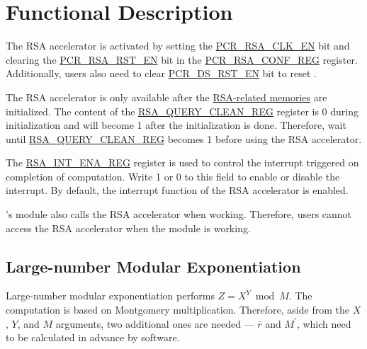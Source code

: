 \documentclass[main\_\_EN.tex]{subfiles}
\begin{document}
\section{Functional Description}

The RSA accelerator is activated by setting the \hyperref[fielddesc:PCRRSACLKEN]{PCR\_RSA\_CLK\_EN} bit and clearing the \hyperref[fielddesc:PCRRSARSTEN]{PCR\_RSA\_RST\_EN} bit in the \hyperref[regdesc:PCRRSACONFREG]{PCR\_RSA\_CONF\_REG} register. Additionally, users also need to clear \hyperref[fielddesc:PCRDSRSTEN]{PCR\_DS\_RST\_EN} bit to reset .

The RSA accelerator is only available after the \hyperref[sec:mem-sum]{RSA-related memories} are initialized. The content of the \hyperref[regdesc:RSAQUERYCLEANREG]{RSA\_QUERY\_CLEAN\_REG} register is 0 during initialization and will become 1 after the initialization is done. Therefore, wait until \hyperref[regdesc:RSAQUERYCLEANREG]{RSA\_QUERY\_CLEAN\_REG} becomes 1 before using the RSA accelerator.
 
The \hyperref[regdesc:RSAINTENAREG]{RSA\_INT\_ENA\_REG} register is used to control the interrupt triggered on completion of computation. Write 1 or 0 to this field to enable or disable the interrupt. By default, the interrupt function of the RSA accelerator is enabled.


\begin{importantlisting}
\vspace{-0.5em}

    \chipname{}'s  module also calls the RSA accelerator when working. Therefore, users cannot access the RSA accelerator when the  module is working.
\end{importantlisting}

\subsection{Large-number Modular Exponentiation} \label{sec:rsa-large-modular-Exponentiation}

Large-number modular exponentiation performs \begin{math}Z = X^{Y} \bmod M\end{math}. The computation is based on Montgomery multiplication. Therefore, aside from the \begin{math}X\end{math},
\begin{math}Y\end{math}, and
\begin{math}M\end{math} arguments, two additional ones are needed --- \begin{math}\overline{r}\end{math} and
\begin{math}M^{\prime}\end{math}, which need to be calculated in advance by software.
\end{document}
